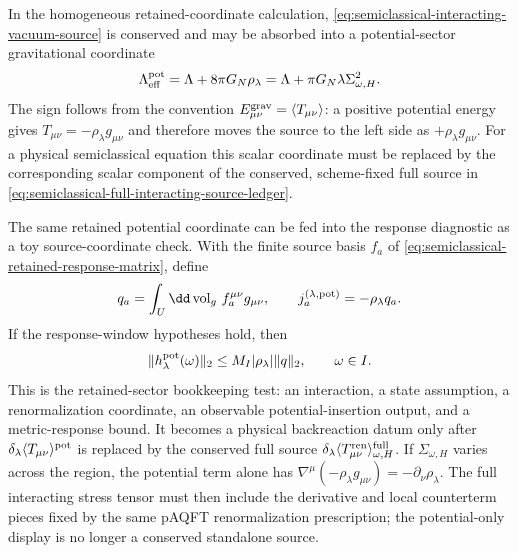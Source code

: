 In the homogeneous retained-coordinate calculation,
\eqref{eq:semiclassical-interacting-vacuum-source} is conserved and may be
absorbed into a potential-sector gravitational coordinate
\begin{equation}
  \Lambda_{\rm eff}^{\rm pot}
  =
  \Lambda
  +
  8\pi G_N\rho_\lambda
  =
  \Lambda+\pi G_N\lambda\Sigma_{\omega,H}^2 .
  \label{eq:semiclassical-interacting-lambda-shift}
\end{equation}
The sign follows from the convention
\(E_{\mu\nu}^{\rm grav}=\langle T_{\mu\nu}\rangle\): a positive potential
energy gives \(T_{\mu\nu}=-\rho_\lambda g_{\mu\nu}\) and therefore moves the
source to the left side as \(+\rho_\lambda g_{\mu\nu}\).  For a physical
semiclassical equation this scalar coordinate must be replaced by the
corresponding scalar component of the conserved, scheme-fixed full source in
\eqref{eq:semiclassical-full-interacting-source-ledger}.

The same retained potential coordinate can be fed into the response
diagnostic as a toy source-coordinate check.  With the finite source basis
\(f_a\) of
\eqref{eq:semiclassical-retained-response-matrix}, define
\begin{equation}
  q_a
  =
  \int_U\dd\operatorname{vol}_g\, f_a^{\mu\nu}g_{\mu\nu},
  \qquad
  j_a^{(\lambda,{\rm pot})}
  =
  -\rho_\lambda q_a .
  \label{eq:semiclassical-interacting-retained-source}
\end{equation}
If the response-window hypotheses hold, then
\begin{equation}
  \lVert h_\lambda^{\rm pot}(\omega)\rVert_2
  \le
  M_I|\rho_\lambda|\lVert q\rVert_2,
  \qquad
  \omega\in I .
  \label{eq:semiclassical-interacting-response-bound}
\end{equation}
This is the retained-sector bookkeeping test: an interaction, a state
assumption, a renormalization coordinate, an observable potential-insertion
output, and a metric-response bound.  It becomes a physical backreaction
datum only after
\(\delta_\lambda\langle T_{\mu\nu}\rangle^{\rm pot}\) is replaced by the
conserved full source
\(\delta_\lambda
\langle T_{\mu\nu}^{\rm ren}\rangle_{\omega,H}^{\rm full}\).  If
\(\Sigma_{\omega,H}\) varies across the region, the potential term alone has
\(\nabla^\mu(-\rho_\lambda g_{\mu\nu})=-\partial_\nu\rho_\lambda\).  The
full interacting stress tensor must then include the derivative and local
counterterm pieces fixed by the same pAQFT renormalization prescription; the
potential-only display is no longer a conserved standalone source.

